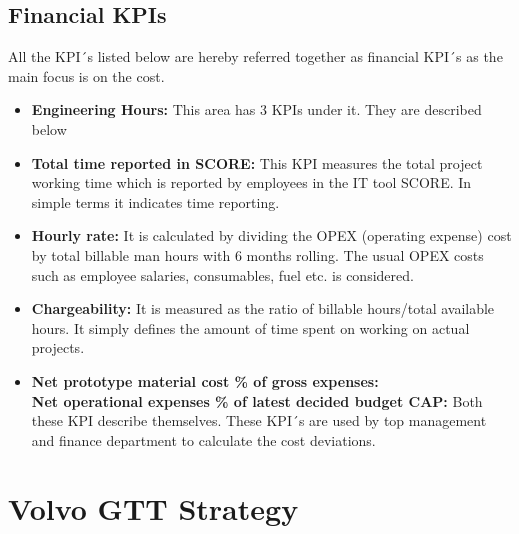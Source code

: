 \subsection{Financial KPIs}
All the KPI´s listed below are hereby referred together as financial KPI´s as the main focus is on the cost.\\
\begin{itemize}
    
     \item \textbf{Engineering Hours:} This area has 3 KPIs under it. They are described below 

     \item \textbf{Total time reported in SCORE:}
This KPI measures the total project working time which is reported by employees in the IT tool SCORE. In simple terms it indicates time reporting.

     \item \textbf{Hourly rate:}
It is calculated by dividing the OPEX (operating expense) cost by total billable man hours with 6 months rolling. The usual OPEX costs such as employee salaries, consumables, fuel etc. is considered.  

     \item \textbf{Chargeability:}
It is measured as the ratio of billable hours/total available hours. It simply defines the amount of time spent on working on actual projects. 

     \item \textbf{Net prototype material cost \% of gross expenses:\\
Net operational expenses \% of latest decided budget CAP: }
Both these KPI describe themselves. These KPI´s are used by top management and finance department to calculate the cost deviations.\\

\end{itemize}


\section{Volvo GTT Strategy} 

